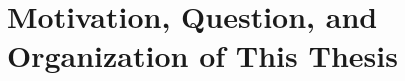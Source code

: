 \section[Motivation, Question, and more]{Motivation, Question, and Organization of This Thesis}
\label{intro:question}
